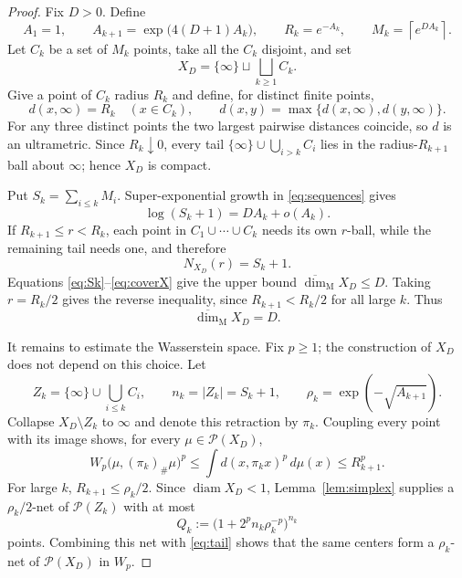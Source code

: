 \documentclass[11pt]{article}
\newcommand{\Prob}{\mathcal P}
\newcommand{\Mdim}{\overline{\dim}_{\mathrm M}}
\begin{document}
\begin{proof}
Fix $D>0$.  Define
\[
 A_1=1,
 \qquad
 A_{k+1}=\exp\bigl(4(D+1)A_k\bigr),
 \qquad
 R_k=e^{-A_k},
 \qquad
 M_k=\left\lceil e^{DA_k}\right\rceil.
\tag{2}\label{eq:sequences}
\]
Let $C_k$ be a set of $M_k$ points, take all the $C_k$ disjoint, and set
\[
                    X_D=\{\infty\}\sqcup\bigsqcup_{k\geq1}C_k.
\]
Give a point of $C_k$ radius $R_k$ and define, for distinct finite points,
\[
 d(x,\infty)=R_k\quad(x\in C_k),
 \qquad
 d(x,y)=\max\{d(x,\infty),d(y,\infty)\}.
\tag{3}\label{eq:metric}
\]
For any three distinct points the two largest pairwise distances coincide,
so $d$ is an ultrametric.  Since $R_k\downarrow0$, every tail
$\{\infty\}\cup\bigcup_{i>k}C_i$ lies in the radius-$R_{k+1}$ ball about
$\infty$; hence $X_D$ is compact.

Put $S_k=\sum_{i\leq k}M_i$.  Super-exponential growth in
\eqref{eq:sequences} gives
\[
                     \log(S_k+1)=DA_k+o(A_k).
\tag{4}\label{eq:Sk}
\]
If $R_{k+1}\leq r<R_k$, each point in $C_1\cup\cdots\cup C_k$ needs its
own $r$-ball, while the remaining tail needs one, and therefore
\[
                         N_{X_D}(r)=S_k+1.
\tag{5}\label{eq:coverX}
\]
Equations \eqref{eq:Sk}--\eqref{eq:coverX} give the upper bound
$\Mdim X_D\leq D$.  Taking $r=R_k/2$ gives the reverse inequality, since
$R_{k+1}<R_k/2$ for all large $k$.  Thus
\[
                              \Mdim X_D=D.
\tag{6}\label{eq:Mdim}
\]

It remains to estimate the Wasserstein space.  Fix $p\geq1$; the
construction of $X_D$ does not depend on this choice.  Let
\[
 Z_k=\{\infty\}\cup\bigcup_{i\leq k}C_i,
 \qquad n_k=|Z_k|=S_k+1,
 \qquad \rho_k=\exp(-\sqrt{A_{k+1}}).
\tag{7}\label{eq:rhok}
\]
Collapse $X_D\setminus Z_k$ to $\infty$ and denote this retraction by
$\pi_k$.  Coupling every point with its image shows, for every
$\mu\in\Prob(X_D)$,
\[
 W_p\bigl(\mu,(\pi_k)_\#\mu\bigr)^p
 \leq\int d(x,\pi_kx)^p\,d\mu(x)
 \leq R_{k+1}^p.
\tag{8}\label{eq:tail}
\]
For large $k$, $R_{k+1}\leq\rho_k/2$.  Since $\operatorname{diam}X_D<1$,
Lemma~\ref{lem:simplex} supplies a $\rho_k/2$-net of $\Prob(Z_k)$ with at
most
\[
              Q_k:=\bigl(1+2^p n_k\rho_k^{-p}\bigr)^{n_k}
\tag{9}\label{eq:Qk}
\]
points.  Combining this net with \eqref{eq:tail} shows that the same centers
form a $\rho_k$-net of $\Prob(X_D)$ in $W_p$.


\end{proof}
\end{document}
